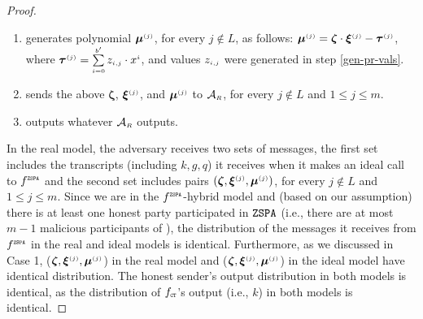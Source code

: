 \begin{proof}
\begin{enumerate}
%
 \item generates polynomial ${\bm\mu}^{\scriptscriptstyle (j)}$, for every $j \notin L$, as follows:
   ${\bm\mu}^{\scriptscriptstyle (j)} = {\bm\zeta}\cdot {\bm\xi}^{\scriptscriptstyle (j)}-\bm\tau^{\scriptscriptstyle (j)}$, where ${\bm\tau}^{\scriptscriptstyle (j)}=\sum\limits^{\scriptscriptstyle b'}_{\scriptscriptstyle i=0}z_{\scriptscriptstyle i,j}\cdot x^{\scriptscriptstyle i}$, and values $z_{\scriptscriptstyle i,j}$ were generated in step \ref{gen-pr-vals}.
%
\item sends the above ${\bm \zeta}$,  ${\bm\xi}^{\scriptscriptstyle (j)}$, and ${\bm\mu}^{\scriptscriptstyle (j)}$ to $\mathcal{A}_{\scriptscriptstyle R}$, for every $j\notin L$ and $1\leq j \leq m$. 
%
\item\label{adversary-outputs--} outputs whatever  $\mathcal{A}_{\scriptscriptstyle R}$ outputs. 
%
 \end{enumerate}
%

In the real model, the adversary receives two sets of messages, the first set includes the transcripts (including $ k,  g,  q$) it receives when it makes an ideal call to $f^{\scriptscriptstyle \mathtt{ZSPA}}$ and the second set includes pairs $({\bm \zeta},  {\bm\xi}^{\scriptscriptstyle (j)}, {\bm\mu}^{\scriptscriptstyle (j)})$, for every $j\notin  L$ and $1\leq j \leq m$. Since we are in the  $f^{\scriptscriptstyle \mathtt{ZSPA}}$-hybrid model and (based on our assumption) there is at least one honest party participated in  $\mathtt{ZSPA}$ (i.e., there are at most $m-1$ malicious participants of \zspa), the distribution of the messages it receives from $f^{\scriptscriptstyle \mathtt{ZSPA}}$ in the real and ideal models is identical. Furthermore, as we discussed in Case 1, (${\bm \zeta}, {\bm\xi}^{\scriptscriptstyle (j)}, {\bm\mu}^{\scriptscriptstyle (j)}$) in the real model and ($ {\bm \zeta}, {\bm\xi}^{\scriptscriptstyle (j)}, {\bm\mu}^{\scriptscriptstyle (j)}$) in the ideal model have identical distribution. The honest sender's output distribution in both models is identical, as the distribution of $f_{\scriptscriptstyle \mathtt{CT}}$'s output (i.e., $ k$) in both models is identical.




\end{proof}
